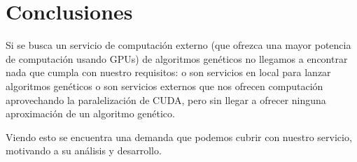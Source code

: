 \bigskip
\section{Conclusiones}
\bigskip

Si se busca un servicio de computación externo (que ofrezca una mayor potencia de computación usando GPUs) de algoritmos genéticos no llegamos a encontrar nada que cumpla con nuestro requisitos: o son servicios en local para lanzar algoritmos genéticos o son servicios externos que nos ofrecen computación aprovechando la paralelización de CUDA, pero sin llegar a ofrecer ninguna aproximación de un algoritmo genético.

Viendo esto se encuentra una demanda que podemos cubrir con nuestro servicio, motivando a su análisis y desarrollo.







